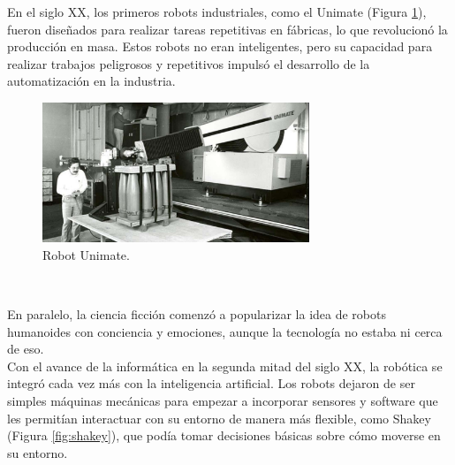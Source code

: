 En el siglo XX, los primeros robots industriales, como el Unimate (Figura \ref{fig:unimate}), fueron diseñados para realizar tareas repetitivas en fábricas, lo que revolucionó la producción en masa. Estos robots no eran inteligentes, pero su capacidad para realizar trabajos peligrosos y repetitivos impulsó el desarrollo de la automatización en la industria.\\

\begin{figure} [h!]
  \begin{center}
    \includegraphics[width=8cm]{figs/unimate}
  \end{center}
  \caption{Robot Unimate.}
  \label{fig:unimate}
\end{figure}\

En paralelo, la ciencia ficción comenzó a popularizar la idea de robots humanoides con conciencia y emociones, aunque la tecnología no estaba ni cerca de eso.\\


Con el avance de la informática en la segunda mitad del siglo XX, la robótica se integró cada vez más con la inteligencia artificial. Los robots dejaron de ser simples máquinas mecánicas para empezar a incorporar sensores y software que les permitían interactuar con su entorno de manera más flexible, como Shakey (Figura \ref{fig:shakey}), que podía tomar decisiones básicas sobre cómo moverse en su entorno.

